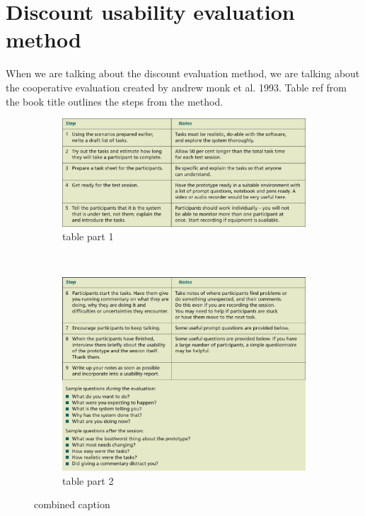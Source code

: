 \section{Discount usability evaluation method}
When we are talking about the discount evaluation method, we are talking about the cooperative evaluation created by andrew monk et al. 1993. Table ref from the book title outlines the steps from the method.

\begin{figure}[]
  \centering      
    \begin{subfigure}[b]{\textwidth}
    \begin{center}
      \includegraphics[scale=0.5]{./pics/UsabilityTableP1}
      \caption{table part 1}
      \label{fig:bluej_iterator_code}
    \end{center}
    \end{subfigure}
    ~\\
    \begin{subfigure}[b]{\textwidth}
    \begin{center}
      \includegraphics[scale=0.5]{./pics/UsabilityTableP2}
      \caption{table part 2}
      \label{fig:bluej_iterator_code2}
    \end{center}
    \end{subfigure}
    \caption{combined caption}
    \label{fig:bluej_iterator}
\end{figure}

